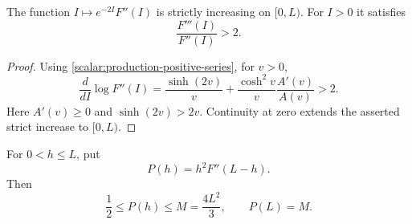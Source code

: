 \begin{lemma}
\label{scalar:curvature-growth}
The function $I\mapsto e^{-2I}F''(I)$ is strictly increasing on
$[0,L)$.  For $I>0$ it satisfies
\[
 \frac{F'''(I)}{F''(I)}>2.
\]
\end{lemma}
\begin{proof}
Using \eqref{scalar:production-positive-series}, for $v>0$,
\[
 \frac{d}{dI}\log F''(I)
 =\frac{\sinh(2v)}v
  +\frac{\cosh^2v}{v}\frac{A'(v)}{A(v)}>2.
\]
Here $A'(v)\ge0$ and $\sinh(2v)>2v$.  Continuity at zero
extends the asserted strict increase to $[0,L)$.
\end{proof}

\begin{lemma}
\label{scalar:scaled-curvature}
For $0<h\le L$, put
\begin{equation}
\label{scalar:scaled-curvature-definition}
 P(h)=h^2F''(L-h).
\end{equation}
Then
\begin{equation}
\label{scalar:scaled-curvature-range}
 \frac12\le P(h)\le M=\frac{4L^2}{3},\qquad P(L)=M.
\end{equation}
\end{lemma}
